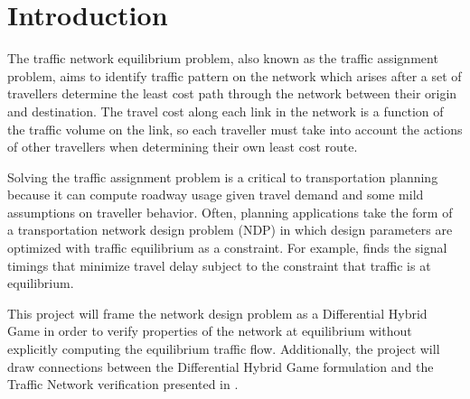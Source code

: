 \section{Introduction}

The traffic network equilibrium problem, also known as the traffic assignment problem, aims to identify traffic pattern on the network which arises after a set of travellers determine the least cost path through the network between their origin and destination. \citep{nagurney2009netecon} The travel cost along each link in the network is a function of the traffic volume on the link, so each traveller must take into account the actions of other travellers when determining their own least cost route.

Solving the traffic assignment problem is a critical to transportation planning because it can compute roadway usage given travel demand and some mild assumptions on traveller behavior. Often, planning applications take the form of a transportation network design problem (NDP) in which design parameters are optimized with traffic equilibrium as a constraint. For example, \citet{sheffi1983optimal} finds the signal timings that minimize travel delay subject to the constraint that traffic is at equilibrium.

This project will frame the network design problem as a Differential Hybrid Game \citep{DBLP:journals/tocl/Platzer17} in order to verify properties of the network at equilibrium without explicitly computing the equilibrium traffic flow. Additionally, the project will draw connections between the Differential Hybrid Game formulation and the Traffic Network verification presented in \citet{DBLP:conf/itsc/MullerMP15}.

